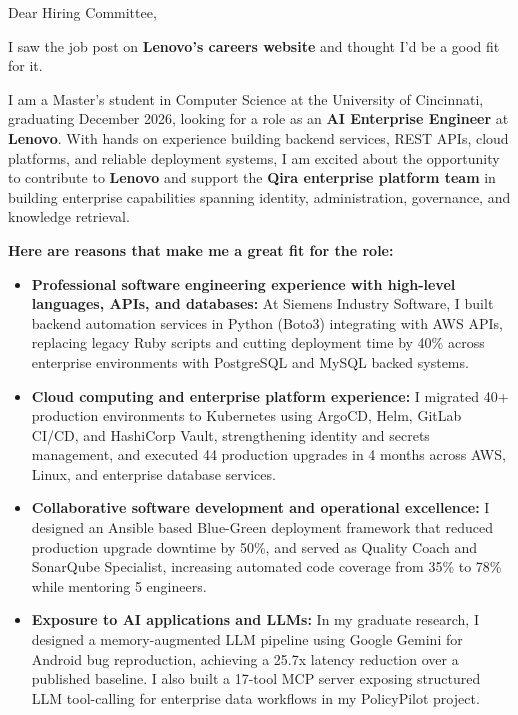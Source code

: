 \documentclass[11pt]{letter}
\date{}
\begin{document}
\begin{letter}{}

\opening{Dear Hiring Committee,}

I saw the job post on \textbf{Lenovo's careers website} and thought I'd be a good fit for it.

I am a Master's student in Computer Science at the University of Cincinnati, graduating December 2026, looking for a role as an \textbf{AI Enterprise Engineer} at \textbf{Lenovo}. With hands on experience building backend services, REST APIs, cloud platforms, and reliable deployment systems, I am excited about the opportunity to contribute to \textbf{Lenovo} and support the \textbf{Qira enterprise platform team} in building enterprise capabilities spanning identity, administration, governance, and knowledge retrieval.

\textbf{Here are reasons that make me a great fit for the role:}

\begin{itemize}[leftmargin=*, itemsep=0.45em]
    \item \textbf{Professional software engineering experience with high-level languages, APIs, and databases:} At Siemens Industry Software, I built backend automation services in Python (Boto3) integrating with AWS APIs, replacing legacy Ruby scripts and cutting deployment time by 40\% across enterprise environments with PostgreSQL and MySQL backed systems.

    \item \textbf{Cloud computing and enterprise platform experience:} I migrated 40+ production environments to Kubernetes using ArgoCD, Helm, GitLab CI/CD, and HashiCorp Vault, strengthening identity and secrets management, and executed 44 production upgrades in 4 months across AWS, Linux, and enterprise database services.

    \item \textbf{Collaborative software development and operational excellence:} I designed an Ansible based Blue-Green deployment framework that reduced production upgrade downtime by 50\%, and served as Quality Coach and SonarQube Specialist, increasing automated code coverage from 35\% to 78\% while mentoring 5 engineers.

    \item \textbf{Exposure to AI applications and LLMs:} In my graduate research, I designed a memory-augmented LLM pipeline using Google Gemini for Android bug reproduction, achieving a 25.7x latency reduction over a published baseline. I also built a 17-tool MCP server exposing structured LLM tool-calling for enterprise data workflows in my PolicyPilot project.
\end{itemize}


\end{letter}
\end{document}
